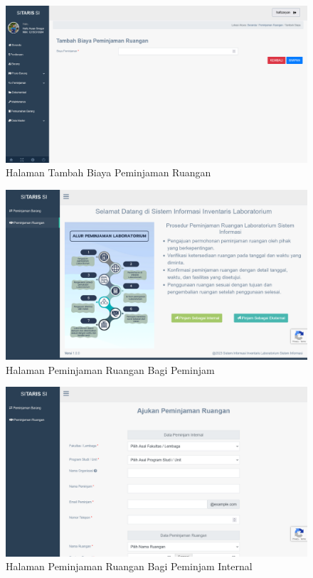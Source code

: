 \begin{enumerate}
        \begin{figure}
          \centering
          \includegraphics[width=0.82\linewidth]{konten//gambar/tambah biaya peminjaman ruangan.png}
          \caption{Halaman Tambah Biaya Peminjaman Ruangan}
          \label{fig:enter-label}
        \end{figure}

        \begin{figure}
          \centering
          \includegraphics[width=0.82\linewidth]{konten//gambar/peminjaman ruangan peminjam.png}
          \caption{Halaman Peminjaman Ruangan Bagi Peminjam}
          \label{fig:enter-label}
        \end{figure}

        \begin{figure}
          \centering
          \includegraphics[width=0.82\linewidth]{konten//gambar/peminjaman ruangan tambah internal.png}
          \caption{Halaman Peminjaman Ruangan Bagi Peminjam Internal}
          \label{fig:enter-label}
        \end{figure}


\end{enumerate}
